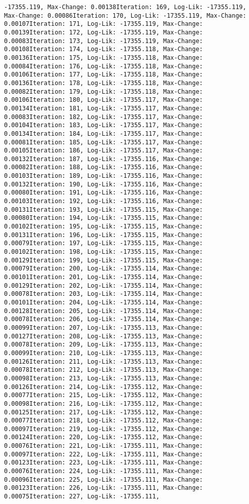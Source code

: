 \documentclass[
]{article}
\begin{document}
\begin{verbatim}
-17355.119, Max-Change: 0.00138Iteration: 169, Log-Lik: -17355.119, Max-Change: 0.00086Iteration: 170, Log-Lik: -17355.119, Max-Change: 0.00107Iteration: 171, Log-Lik: -17355.119, Max-Change: 0.00139Iteration: 172, Log-Lik: -17355.119, Max-Change: 0.00083Iteration: 173, Log-Lik: -17355.119, Max-Change: 0.00108Iteration: 174, Log-Lik: -17355.118, Max-Change: 0.00136Iteration: 175, Log-Lik: -17355.118, Max-Change: 0.00084Iteration: 176, Log-Lik: -17355.118, Max-Change: 0.00106Iteration: 177, Log-Lik: -17355.118, Max-Change: 0.00136Iteration: 178, Log-Lik: -17355.118, Max-Change: 0.00082Iteration: 179, Log-Lik: -17355.118, Max-Change: 0.00106Iteration: 180, Log-Lik: -17355.117, Max-Change: 0.00134Iteration: 181, Log-Lik: -17355.117, Max-Change: 0.00083Iteration: 182, Log-Lik: -17355.117, Max-Change: 0.00104Iteration: 183, Log-Lik: -17355.117, Max-Change: 0.00134Iteration: 184, Log-Lik: -17355.117, Max-Change: 0.00081Iteration: 185, Log-Lik: -17355.117, Max-Change: 0.00105Iteration: 186, Log-Lik: -17355.117, Max-Change: 0.00132Iteration: 187, Log-Lik: -17355.116, Max-Change: 0.00082Iteration: 188, Log-Lik: -17355.116, Max-Change: 0.00103Iteration: 189, Log-Lik: -17355.116, Max-Change: 0.00132Iteration: 190, Log-Lik: -17355.116, Max-Change: 0.00080Iteration: 191, Log-Lik: -17355.116, Max-Change: 0.00103Iteration: 192, Log-Lik: -17355.116, Max-Change: 0.00131Iteration: 193, Log-Lik: -17355.115, Max-Change: 0.00080Iteration: 194, Log-Lik: -17355.115, Max-Change: 0.00102Iteration: 195, Log-Lik: -17355.115, Max-Change: 0.00131Iteration: 196, Log-Lik: -17355.115, Max-Change: 0.00079Iteration: 197, Log-Lik: -17355.115, Max-Change: 0.00102Iteration: 198, Log-Lik: -17355.115, Max-Change: 0.00129Iteration: 199, Log-Lik: -17355.115, Max-Change: 0.00079Iteration: 200, Log-Lik: -17355.114, Max-Change: 0.00101Iteration: 201, Log-Lik: -17355.114, Max-Change: 0.00129Iteration: 202, Log-Lik: -17355.114, Max-Change: 0.00078Iteration: 203, Log-Lik: -17355.114, Max-Change: 0.00101Iteration: 204, Log-Lik: -17355.114, Max-Change: 0.00128Iteration: 205, Log-Lik: -17355.114, Max-Change: 0.00078Iteration: 206, Log-Lik: -17355.114, Max-Change: 0.00099Iteration: 207, Log-Lik: -17355.113, Max-Change: 0.00127Iteration: 208, Log-Lik: -17355.113, Max-Change: 0.00078Iteration: 209, Log-Lik: -17355.113, Max-Change: 0.00099Iteration: 210, Log-Lik: -17355.113, Max-Change: 0.00126Iteration: 211, Log-Lik: -17355.113, Max-Change: 0.00078Iteration: 212, Log-Lik: -17355.113, Max-Change: 0.00098Iteration: 213, Log-Lik: -17355.113, Max-Change: 0.00126Iteration: 214, Log-Lik: -17355.112, Max-Change: 0.00077Iteration: 215, Log-Lik: -17355.112, Max-Change: 0.00098Iteration: 216, Log-Lik: -17355.112, Max-Change: 0.00125Iteration: 217, Log-Lik: -17355.112, Max-Change: 0.00077Iteration: 218, Log-Lik: -17355.112, Max-Change: 0.00097Iteration: 219, Log-Lik: -17355.112, Max-Change: 0.00124Iteration: 220, Log-Lik: -17355.112, Max-Change: 0.00076Iteration: 221, Log-Lik: -17355.111, Max-Change: 0.00097Iteration: 222, Log-Lik: -17355.111, Max-Change: 0.00123Iteration: 223, Log-Lik: -17355.111, Max-Change: 0.00076Iteration: 224, Log-Lik: -17355.111, Max-Change: 0.00096Iteration: 225, Log-Lik: -17355.111, Max-Change: 0.00123Iteration: 226, Log-Lik: -17355.111, Max-Change: 0.00075Iteration: 227, Log-Lik: -17355.111, 
\end{verbatim}
\end{document}
